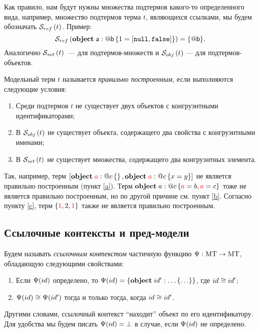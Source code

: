 Как правило, нам будут нужны множества подтермов какого-то определенного вида, например, множество подтермов терма $t$, являющихся ссылками, мы будем обозначать
$\mathcal{S}_{ref}\left(t\right)$. 
Пример: 
$$\mathcal{S}_{ref}\left(\mathbf{object}\;\mathsf{a} : @\mathsf{b}\left\{ 1=\left[\mathtt{null}, \mathtt{false}\right] \right\}\right) = \{@\mathsf{b}\}.$$
Аналогично $\mathcal{S}_{set}\left(t\right)$~--- для подтермов-множеств и $\mathcal{S}_{obj}\left(t\right)$ --- для подтермов-объектов.

\begin{Def}
Модельный терм $t$ называется \emph{правильно построенным}, если выполняются следующие условия:
\begin{enumerate}
\item Среди подтермов $t$ не существует двух объектов с конгруэнтными идентификаторами; \label{a}
\item В $\mathcal{S}_{obj}\left(t\right)$ не существует объекта, содержащего два свойства с конгруэнтными именами; \label{b}
\item В $\mathcal{S}_{set}\left(t\right)$ не существует множества, содержащего два конгруэнтных элемента. \label{c}
\end{enumerate}
\end{Def}

Так, например, терм $\left[\mathbf{object}\;{\color{red}a} : @c\left\{  \right\}, \mathbf{object}\;{\color{red}a} : @c\left\{ x=y \right\}\right]$ не является правильно построенным (пункт \ref{a}). Терм $\mathbf{object}\;a : @c\left\{ {\color{red}a} = b, {\color{red}a} = c \right\}$ тоже не является правильно построенным, но по другой причине см. пункт \ref{b}. Согласно пункту \ref{c}, терм $\left\{{\color{red}1}, 2, {\color{red}1}\right\}$ также не является правильно построенным.

\subsection{Ссылочные контексты и пред-модели}

\begin{Def}
Будем называть \emph{ссылочным контекстом} частичную функцию 
\mbox{$\Psi : \mbox{MT} \rightarrow \mbox{MT}$}, обладающую следующими свойствами: 
\begin{enumerate}
\item Если $\Psi(id)$ определено, то $\Psi(id) = \left\{\mathbf{object}\;id' : \ldots\left\{ \ldots \right\}\right\}$, где $id \cong id'$;
\item $\Psi(id) \cong \Psi(id')$ тогда и только тогда, когда $id \cong id'$.
\end{enumerate}
\end{Def}

Другими словами, ссылочный контекст ``находит'' объект по его идентификатору. Для удобства мы будем писать $\Psi(id)=\bot$ в случае, если $\Psi(id)$ не определено.

